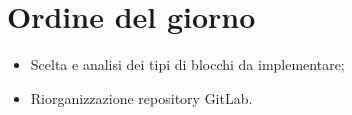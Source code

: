 \section{Ordine del giorno}
\begin{itemize}
    \item Scelta e analisi dei tipi di blocchi da implementare;
    \item Riorganizzazione repository GitLab.
\end{itemize}
